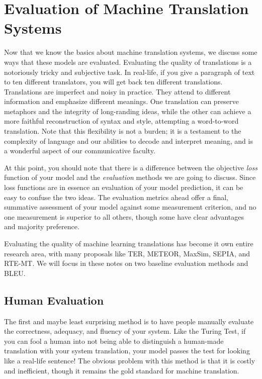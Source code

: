 \documentclass{tufte-handout}
\begin{document}
\section{Evaluation of Machine Translation Systems}
Now that we know the basics about machine translation systems, we discuss some ways that these models are evaluated. Evaluating the quality of translations is a notoriously tricky and subjective task. In real-life, if you give a paragraph of text to ten different translators, you will get back ten different translations. Translations are imperfect and noisy in practice. They attend to different information and emphasize different meanings. One translation can preserve metaphors and the integrity of long-randing ideas, while the other can achieve a more faithful reconstruction of syntax and style, attempting a word-to-word translation.  Note that this flexibility is not a burden; it is a testament to the complexity of language and our abilities to decode and interpret meaning, and is a wonderful aspect of our communicative faculty. 

At this point, you should note that there is a difference between the objective \textit{loss} function of your model and the \textit{evaluation} methods we are going to discuss. Since loss functions are in essence an evaluation of your model prediction, it can be easy to confuse the two ideas. The evaluation metrics ahead offer a final, summative assessment of your model against some measurement criterion, and no one measurement is superior to all others, though some have clear advantages and majority preference. 

Evaluating the quality of machine learning translations has become it own entire research area, with many proposals like TER, METEOR, MaxSim, SEPIA, and RTE-MT. We will focus in these notes on two baseline evaluation methods and BLEU.

\subsection{Human Evaluation}
The first and maybe least surprising method is to have people manually evaluate the correctness, adequacy, and fluency of your system. Like the Turing Test, if you can fool a human into not being able to distinguish a human-made translation with your system translation, your model passes the test for looking like a real-life sentence! The obvious problem with this method is that it is costly and inefficient, though it remains the gold standard for machine translation.
\end{document}
